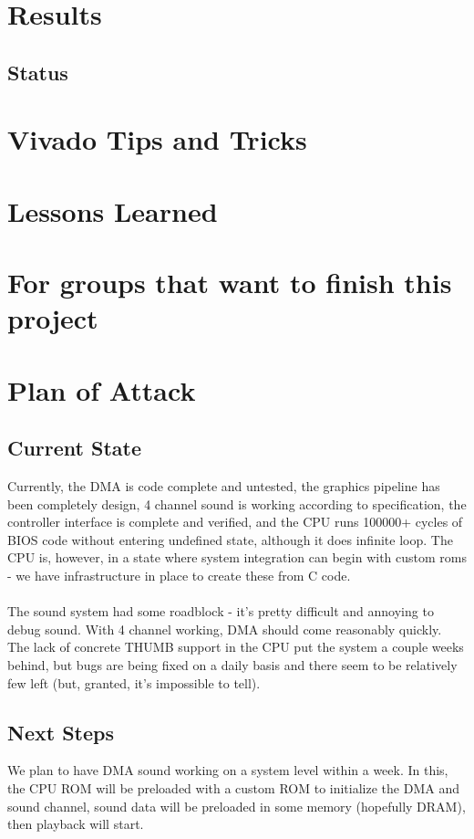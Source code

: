 \documentclass[11pt,a4paper,draft]{article}
\begin{document}
	\section{Results}
	
	\subsection{Status}
	
	\section{Vivado Tips and Tricks}
	
	\section{Lessons Learned}
	
	\section{For groups that want to finish this project}

	
	
	\section{Plan of Attack}
	\subsection{Current State}
	Currently, the DMA is code complete and untested, the graphics pipeline has been completely design, 4 channel sound is working according to specification, the controller interface is complete and verified, and the CPU runs 100000+ cycles of BIOS code without entering undefined state, although it does infinite loop. The CPU is, however, in a state where system integration can begin with custom roms - we have infrastructure in place to create these from C code. \\\\
	The sound system had some roadblock - it's pretty difficult and annoying to debug sound. With 4 channel working, DMA should come reasonably quickly. The lack of concrete THUMB support in the CPU put the system a couple weeks behind, but bugs are being fixed on a daily basis and there seem to be relatively few left (but, granted, it's impossible to tell). 
	
	\subsection{Next Steps}
	We plan to have DMA sound working on a system level within a week. In this, the CPU ROM will be preloaded with a custom ROM to initialize the DMA and sound channel, sound data will be preloaded in some memory (hopefully DRAM), then playback will start. 
	
	\printbibliography
	
\end{document}
